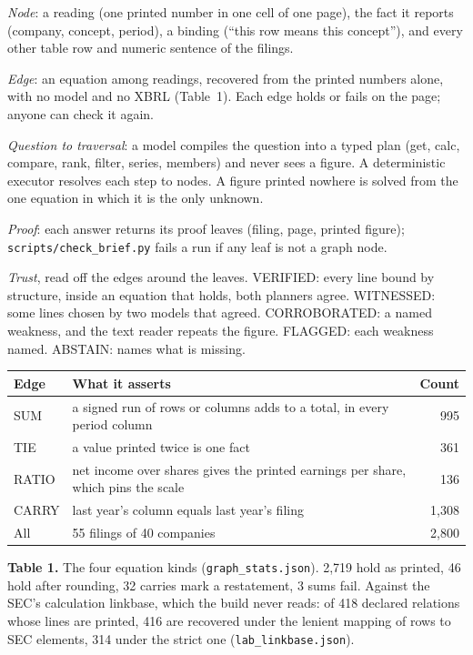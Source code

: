 \documentclass[10pt]{article}
\newcommand{\head}[1]{\vspace{5pt}{\normalsize\bfseries #1}\vspace{1pt}\par}
\newenvironment{tight}{\begin{list}{\textbullet}{\setlength{\leftmargin}{9pt}\setlength{\itemsep}{0.8pt}\setlength{\parsep}{0pt}\setlength{\topsep}{1pt}\setlength{\labelsep}{4pt}}}{\end{list}}
\newcommand{\rf}[1]{{\footnotesize\texttt{#1}}}
\begin{document}
\head{2. The graph in five lines}
\begin{minipage}[t]{0.53\textwidth}
\vspace{0pt}
\begin{tight}
\item \emph{Node}: a reading (one printed number in one cell of one page), the fact it reports (company, concept, period), a binding (``this row means this concept''), and every other table row and numeric sentence of the filings.
\item \emph{Edge}: an equation among readings, recovered from the printed numbers alone, with no model and no XBRL (Table~1). Each edge holds or fails on the page; anyone can check it again.
\item \emph{Question to traversal}: a model compiles the question into a typed plan (get, calc, compare, rank, filter, series, members) and never sees a figure. A deterministic executor resolves each step to nodes. A figure printed nowhere is solved from the one equation in which it is the only unknown.
\item \emph{Proof}: each answer returns its proof leaves (filing, page, printed figure); \texttt{scripts/check\_brief.py} fails a run if any leaf is not a graph node.
\item \emph{Trust}, read off the edges around the leaves. VERIFIED: every line bound by structure, inside an equation that holds, both planners agree. WITNESSED: some lines chosen by two models that agreed. CORROBORATED: a named weakness, and the text reader repeats the figure. FLAGGED: each weakness named. ABSTAIN: names what is missing.
\end{tight}
\end{minipage}\hfill
\begin{minipage}[t]{0.44\textwidth}
\vspace{0pt}
{\footnotesize\setlength{\tabcolsep}{3pt}
\begin{tabular}{@{}p{1.15cm}p{3.55cm}r@{}}
\toprule
Edge & What it asserts & Count \\
\midrule
SUM & a signed run of rows or columns adds to a total, in every period column & 995 \\
TIE & a value printed twice is one fact & 361 \\
RATIO & net income over shares gives the printed earnings per share, which pins the scale & 136 \\
CARRY & last year's column equals last year's filing & 1,308 \\
\midrule
All & 55 filings of 40 companies & 2,800 \\
\bottomrule
\end{tabular}}

\vspace{2pt}
{\scriptsize\textbf{Table 1.} The four equation kinds (\rf{graph\_stats.json}). 2,719 hold as printed, 46 hold after rounding, 32 carries mark a restatement, 3 sums fail. Against the SEC's calculation linkbase, which the build never reads: of 418 declared relations whose lines are printed, 416 are recovered under the lenient mapping of rows to SEC elements, 314 under the strict one (\rf{lab\_linkbase.json}).}
\end{minipage}
\end{document}
